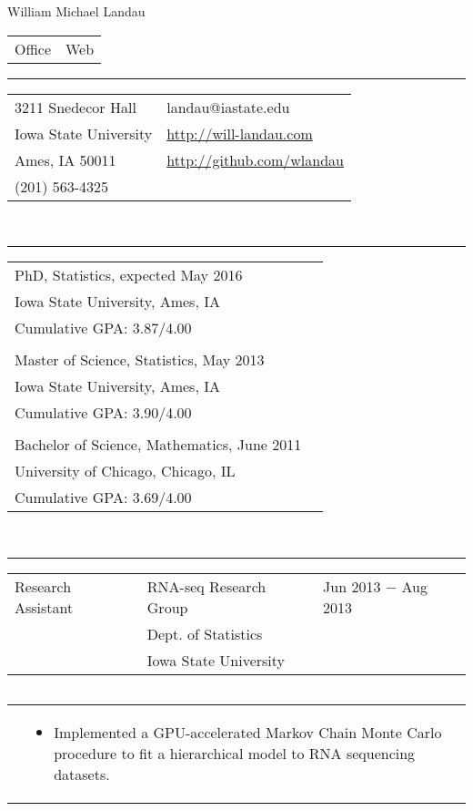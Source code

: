 \documentclass{article}
\newcommand{\q}{$\quad$ \newline}
\newcommand{\vl}{4.25}
\newcommand{\wl}{8.4}
\newcommand{\ww}{13}
\newcommand{\myrule}{\noindent \rule{\textwidth}{1pt}}
\begin{document}
\begin{center}
\LARGE William Michael Landau
\end{center}

\noindent \begin{tabular}{@{}p{13cm}l@{}}
\LARGE Office & \LARGE Web 
\end{tabular}

\myrule

\noindent \begin{tabular}{@{}p{13cm}l@{}}
3211 Snedecor Hall & landau@iastate.edu \\
Iowa State University & \href{http://will-landau.com/}{http://will-landau.com} \\
Ames, IA 50011 & \href{http://github.com/wlandau}{http://github.com/wlandau} \\
(201) 563-4325
\end{tabular} \q \q \q


\myrule

\noindent \begin{tabular}{@{}p{9cm}l@{}}
PhD, Statistics, expected May 2016 & \\
Iowa State University, Ames, IA  & \\
Cumulative GPA: 3.87/4.00 \\
& \\
Master of Science, Statistics, May 2013 \\
 Iowa State University, Ames, IA \\
Cumulative GPA: 3.90/4.00 \\
 & \\
Bachelor of Science, Mathematics, June 2011   \\
University of Chicago, Chicago, IL  \\ 
Cumulative GPA: 3.69/4.00 \\
\end{tabular} \q \q \q


\myrule

\noindent \begin{tabular}{@{}p{\vl cm}p{\wl cm}l@{}}
Research Assistant & RNA-seq Research Group & Jun 2013 $-$ Aug 2013  \\ 
 &Dept. of Statistics&  \\ 
 &Iowa State University&
\end{tabular} \q 

\noindent \begin{tabular}{@{}p{\vl cm}p{\ww cm}@{}}
&\begin{itemize}
\item Implemented a GPU-accelerated Markov Chain Monte Carlo
procedure to fit a hierarchical model to RNA sequencing datasets.
\end{itemize}
\end{tabular} \q 
\end{document}
